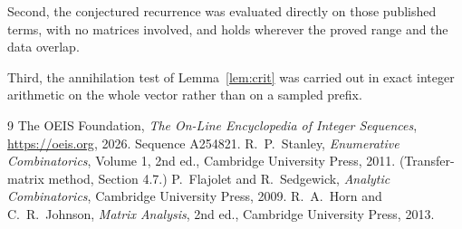 \documentclass[11pt,a4paper]{article}
\theoremstyle{plain}
\theoremstyle{definition}
\begin{document}
Second, the conjectured recurrence was evaluated directly on those published terms, with no
matrices involved, and holds wherever the proved range and the data overlap.

Third, the annihilation test of Lemma~\ref{lem:crit} was carried out in exact integer
arithmetic on the whole vector rather than on a sampled prefix.

\begin{thebibliography}{9}
 The OEIS Foundation, \emph{The On-Line Encyclopedia of Integer
Sequences}, \url{https://oeis.org}, 2026. Sequence A254821.
 R.~P.~Stanley, \emph{Enumerative Combinatorics}, Volume 1, 2nd ed.,
Cambridge University Press, 2011. (Transfer-matrix method, Section 4.7.)
 P.~Flajolet and R.~Sedgewick, \emph{Analytic Combinatorics}, Cambridge
University Press, 2009.
 R.~A.~Horn and C.~R.~Johnson, \emph{Matrix Analysis}, 2nd ed., Cambridge
University Press, 2013.
\end{thebibliography}
\end{document}
